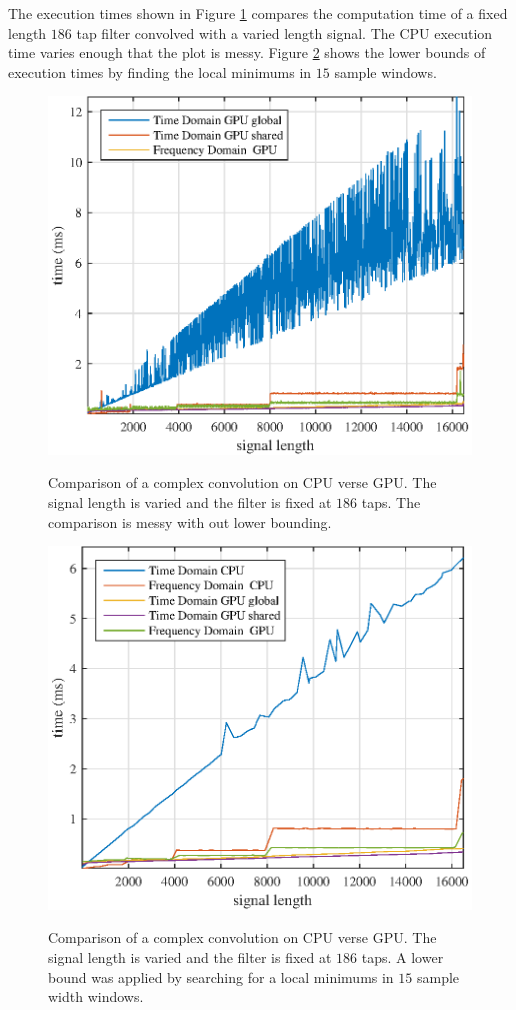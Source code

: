 The execution times shown in Figure \ref{fig:CPUvsGPU_1batch_186taps_varySignal_noMin} compares the computation time of a fixed length $186$ tap filter convolved with a varied length signal.
The CPU execution time varies enough that the plot is messy.
Figure \ref{fig:CPUvsGPU_1batch_186taps_varySignal} shows the lower bounds of execution times by finding the local minimums in $15$ sample windows.
\begin{figure}
	\caption{Comparison of a complex convolution on CPU verse GPU. The signal length is varied and the filter is fixed at $186$ taps. The comparison is messy with out lower bounding.}
	\centering\includegraphics[width=5in]{figures/gpu_intro/CPUvsGPU_1batch_186taps_varySignal_noMin.eps}
	\label{fig:CPUvsGPU_1batch_186taps_varySignal_noMin}
\end{figure}
\begin{figure}
	\caption{Comparison of a complex convolution on CPU verse GPU. The signal length is varied and the filter is fixed at $186$ taps. A lower bound was applied by searching for a local minimums in $15$ sample width windows.}
	\centering\includegraphics[width=5in]{figures/gpu_intro/CPUvsGPU_1batch_186taps_varySignal.eps}
	\label{fig:CPUvsGPU_1batch_186taps_varySignal}
\end{figure}

